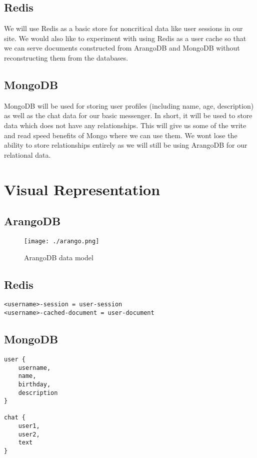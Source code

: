 \documentclass[11pt]{article}
\begin{document}
\subsection{Redis}
\label{sec:orgbde3df8}
We will use Redis as a basic store for noncritical data like user sessions in
our site. We would also like to experiment with using Redis as a user cache
so that we can serve documents constructed from ArangoDB and MongoDB without
reconstructing them from the databases.

\subsection{MongoDB}
\label{sec:org4a5a135}
MongoDB will be used for storing user profiles (including name, age,
description) as well as the chat data for our basic messenger. In short, it
will be used to store data which does not have any relationships. This will
give us some of the write and read speed benefits of Mongo where we can use
them. We wont lose the ability to store relationships entirely as we will
still be using ArangoDB for our relational data.

\section{Visual Representation}
\label{sec:orga769d6e}

\subsection{ArangoDB}
\label{sec:orged9e0b8}
\begin{figure}[htbp]
\centering
\texttt{[image: ./arango.png]}
\caption{ArangoDB data model}
\end{figure}

\subsection{Redis}
\label{sec:org8a316e0}

\begin{verbatim}
<username>-session = user-session
<username>-cached-document = user-document
\end{verbatim}

\subsection{MongoDB}
\label{sec:org303ae3a}
\begin{verbatim}
user {
    username,
    name,
    birthday,
    description
}

chat {
    user1,
    user2,
    text
}
\end{verbatim}
\end{document}
